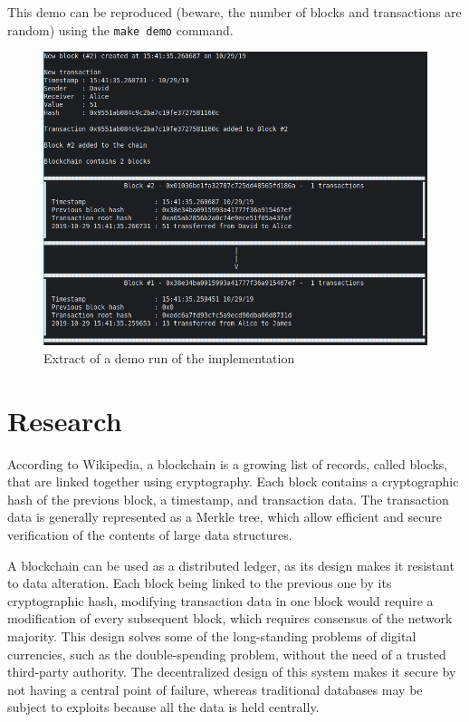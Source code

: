 \documentclass{article}
\begin{document}
This demo can be reproduced (beware, the number of blocks and transactions are random) using the \verb+make demo+ command.

\begin{figure}[h!]
    \begin{center}
        \includegraphics[width=0.7\linewidth]{img/demo.png}
        \caption{Extract of a demo run of the implementation}
        \label{fig:demo}
    \end{center}
\end{figure}


\section{Research}\label{Research}

According to Wikipedia\cite{wiki:blockchain}, a blockchain is a growing list of records, called blocks, that are linked together using cryptography. Each block contains a cryptographic hash of the previous block, a timestamp, and transaction data. The transaction data is generally represented as a Merkle tree, which allow efficient and secure verification of the contents of large data structures.

\bigskip

A blockchain can be used as a distributed ledger, as its design makes it resistant to data alteration. Each block being linked to the previous one by its cryptographic hash, modifying transaction data in one block would require a modification of every subsequent block, which requires consensus of the network majority. This design solves some of the long-standing problems of digital currencies, such as the double-spending problem, without the need of a trusted third-party authority. The decentralized design of this system makes it secure by not having a central point of failure, whereas traditional databases may be subject to exploits because all the data is held centrally.
\end{document}
